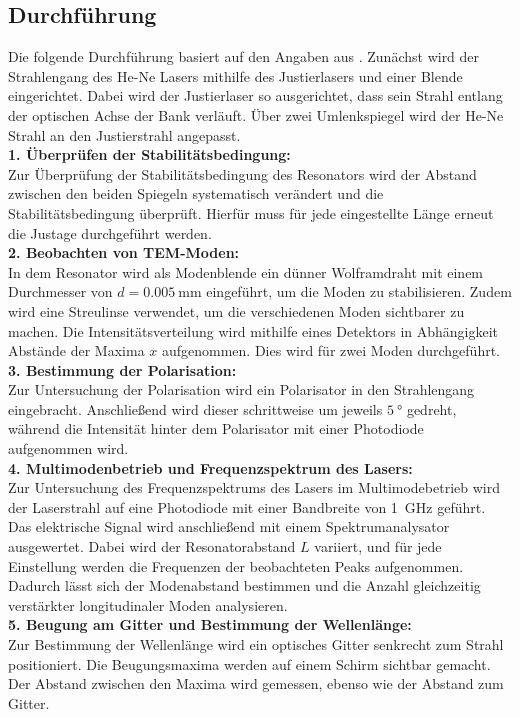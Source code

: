 \subsection{Durchführung}
\label{sec:Durchführung}
Die folgende Durchführung basiert auf den Angaben aus \cite{anleitungV61}.
Zunächst wird der Strahlengang des He-Ne Lasers mithilfe des Justierlasers und einer Blende eingerichtet. Dabei wird der Justierlaser so ausgerichtet, dass sein Strahl entlang der optischen Achse der Bank verläuft. Über zwei Umlenkspiegel wird der He-Ne Strahl an den Justierstrahl angepasst.\\
\textbf{1. Überprüfen der Stabilitätsbedingung:}\\
Zur Überprüfung der Stabilitätsbedingung des Resonators wird der Abstand zwischen den beiden Spiegeln systematisch verändert und die Stabilitätsbedingung überprüft.
Hierfür muss für jede eingestellte Länge erneut die Justage durchgeführt werden.\\
\textbf{2. Beobachten von TEM-Moden:}\\
In dem Resonator wird als Modenblende ein dünner Wolframdraht mit einem Durchmesser von $d=\SI{0.005}{\milli\meter}$  eingeführt, um die Moden zu stabilisieren.
Zudem wird eine Streulinse verwendet, um die verschiedenen Moden sichtbarer zu machen. 
Die Intensitätsverteilung wird mithilfe eines Detektors in Abhängigkeit Abstände der Maxima $x$ aufgenommen. 
Dies wird für zwei Moden durchgeführt.\\
\textbf{3. Bestimmung der Polarisation:}\\
Zur Untersuchung der Polarisation wird ein Polarisator in den Strahlengang eingebracht. Anschließend wird dieser schrittweise um jeweils $\SI{5}{\degree}$ gedreht, während die Intensität hinter dem Polarisator mit einer Photodiode aufgenommen wird.\\
\textbf{4. Multimodenbetrieb und Frequenzspektrum des Lasers:}\\
Zur Untersuchung des Frequenzspektrums des Lasers im Multimodebetrieb wird der Laserstrahl auf eine Photodiode mit einer Bandbreite von \SI{1}{\giga\hertz} geführt. 
Das elektrische Signal wird anschließend mit einem Spektrumanalysator ausgewertet. Dabei wird der Resonatorabstand $L$ variiert, und für jede Einstellung werden die Frequenzen der beobachteten Peaks aufgenommen. Dadurch lässt sich der Modenabstand bestimmen und die Anzahl gleichzeitig verstärkter longitudinaler Moden analysieren.\\
\textbf{5. Beugung am Gitter und Bestimmung der Wellenlänge:}\\
Zur Bestimmung der Wellenlänge wird ein optisches Gitter senkrecht zum Strahl positioniert. Die Beugungsmaxima werden auf einem Schirm sichtbar gemacht. Der Abstand zwischen den Maxima wird gemessen, ebenso wie der Abstand zum Gitter.\\